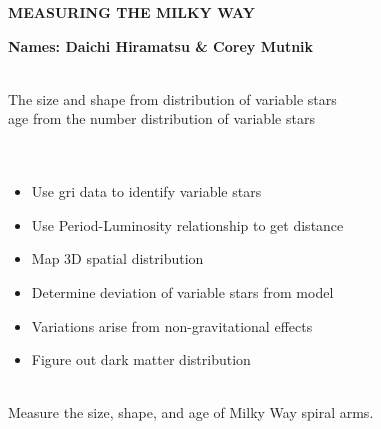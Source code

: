 \documentclass[letterpaper,11pt]{article}
\begin{document}
\pagestyle{plain}

\begin{center} 
\bfseries\uppercase{Measuring the Milky Way}
\end{center}
\vspace{-0.3cm}
\centerline{\bf Names: {Daichi Hiramatsu} \& {Corey Mutnik}}
 



\smallskip\\
The size and shape from distribution of variable stars\\
age from the number distribution of variable stars\\




\smallskip\\
\smallskip\\
\begin{itemize}
	\item{} Use gri data to identify variable stars
	\item{} Use Period-Luminosity relationship to get distance
	\item{} Map 3D spatial distribution
	\item{} Determine deviation of variable stars from model
	\item{} Variations arise from non-gravitational effects
	\item{} Figure out dark matter distribution
\end{itemize}


\smallskip\\
Measure the size, shape, and age of Milky Way spiral arms.  \\
\smallskip\\
\\
\end{document}
